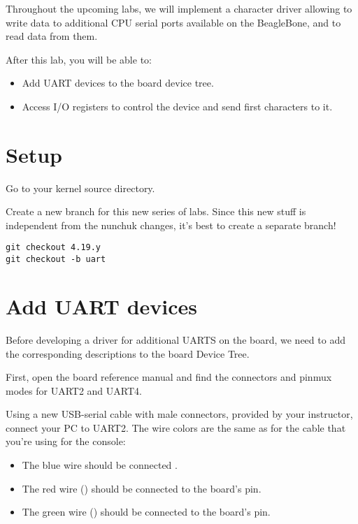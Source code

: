 
Throughout the upcoming labs, we will implement a character driver
allowing to write data to additional CPU serial ports available on
the BeagleBone, and to read data from them.

After this lab, you will be able to:

\begin{itemize}
\item Add UART devices to the board device tree.
\item Access I/O registers to control the device and
      send first characters to it.
\end{itemize}

\section{Setup}

Go to your kernel source directory.

Create a new branch for this new series of labs. Since this new stuff
is independent from the nunchuk changes, it's best to create a separate
branch!

\begin{verbatim}
git checkout 4.19.y
git checkout -b uart
\end{verbatim}

\section{Add UART devices}

Before developing a driver for additional UARTS on the board, we
need to add the corresponding descriptions to the board Device Tree.

First, open the board reference manual and find the connectors
and pinmux modes for UART2 and UART4.

Using a new USB-serial cable with male connectors, provided by your
instructor, connect your PC to UART2. The wire colors are the same
as for the cable that you're using for the console:

\begin{itemize}
\item The blue wire should be connected .
\item The red wire () should be connected to the board's  pin.
\item The green wire () should be connected to the board's  pin.
\end{itemize}

